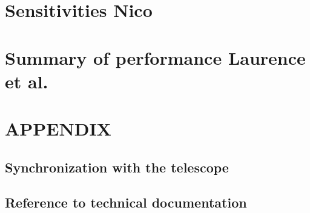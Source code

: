 \documentclass[a4paper, 11pt]{report}
\begin{document}
\clearpage
%


\clearpage
\chapter{Sensitivities {\color{blue} Nico}}
\label{se:nefd}


%



\clearpage
\chapter{Summary of performance {\color{blue} Laurence et al.}}
\label{se:summary}



\clearpage
\appendix

\chapter{APPENDIX}

  \section{Synchronization with the telescope}
  \label{ap:synchro}
  
  
  \section{Reference to technical documentation}
  \label{ap:doc}
  
\end{document}
